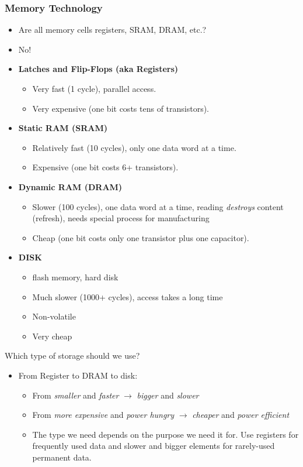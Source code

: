 \documentclass[10pt]{article}
\begin{document}
\subsubsection*{Memory Technology}
\begin{itemize}
    \item Are all memory cells registers, SRAM, DRAM, etc.?
    \item No!
    \item \textbf{Latches and Flip-Flops (aka Registers)}
    \begin{itemize}
        \item Very fast (1 cycle), parallel access.
        \item Very expensive (one bit costs tens of transistors).
    \end{itemize}
    \item \textbf{Static RAM (SRAM)}
    \begin{itemize}
        \item Relatively fast (10 cycles), only one data word at a time.
        \item Expensive (one bit costs 6+ transistors).
    \end{itemize}
    \item \textbf{Dynamic RAM (DRAM)}
    \begin{itemize}
        \item Slower (100 cycles), one data word at a time, reading \textit{destroys} content (refresh), needs special process for manufacturing
        \item Cheap (one bit costs only one transistor plus one capacitor).
    \end{itemize}
    \item \textbf{DISK}
    \begin{itemize}
        \item flash memory, hard disk
        \item Much slower (1000+ cycles), access takes a long time
        \item Non-volatile
        \item Very cheap
    \end{itemize}
\end{itemize}
Which type of storage should we use?
\begin{itemize}
    \item From Register to DRAM to disk:
    \begin{itemize}
        \item From \textit{smaller} and \textit{faster} $\rightarrow$ \textit{bigger} and \textit{slower}
        \item From \textit{more expensive} and \textit{power hungry} $\rightarrow$ \textit{cheaper} and \textit{power efficient}
        \item The type we need depends on the purpose we need it for.  Use registers for frequently used data and slower and bigger elements for rarely-used permanent data.
    \end{itemize}
\end{itemize}
\end{document}
